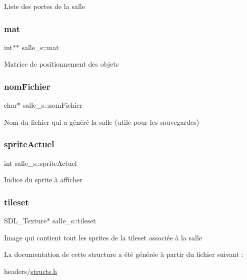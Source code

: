 Liste des portes de la salle \mbox{\label{structsalle__s_ad9934630b58b551f8f185dead2006ba6}} 
\subsubsection{\texorpdfstring{mat}{mat}}
{\footnotesize\ttfamily int$\ast$$\ast$ salle\+\_\+s\+::mat}

Matrice de positionnement des objets \mbox{\label{structsalle__s_a12e47589795f5ed60109cf2b073ec671}} 
\subsubsection{\texorpdfstring{nom\+Fichier}{nomFichier}}
{\footnotesize\ttfamily char$\ast$ salle\+\_\+s\+::nom\+Fichier}

Nom du fichier qui a généré la salle (utile pour les sauvegardes) \mbox{\label{structsalle__s_a0305fc652ff8d07decc455bfc34ea595}} 
\subsubsection{\texorpdfstring{sprite\+Actuel}{spriteActuel}}
{\footnotesize\ttfamily int salle\+\_\+s\+::sprite\+Actuel}

Indice du sprite à afficher \mbox{\label{structsalle__s_a44a7c08d109019af0e4877e488cef708}} 
\subsubsection{\texorpdfstring{tileset}{tileset}}
{\footnotesize\ttfamily S\+D\+L\+\_\+\+Texture$\ast$ salle\+\_\+s\+::tileset}

Image qui contient tout les sprites de la tileset associée à la salle 

La documentation de cette structure a été générée à partir du fichier suivant \+:\begin{DoxyCompactItemize}
\item 
headers/\hyperlink{structs_8h}{structs.\+h}\end{DoxyCompactItemize}
